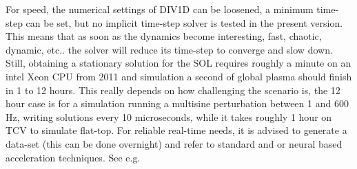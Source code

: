 \documentclass[amsmath,amssymb,a4]{revtex4-2}
\begin{document}
\noindent For speed, the numerical settings of DIV1D can be loosened, a minimum time-step can be set, but no implicit time-step solver is tested in the present version. This means that as soon as the dynamics become interesting, fast, chaotic, dynamic, etc.. the solver will reduce its time-step to converge and slow down. Still, obtaining a stationary solution for the SOL requires roughly a minute on an intel Xeon CPU from 2011 and simulation a second of global plasma should finish in 1 to 12 hours. This really depends on how challenging the scenario is, the 12 hour case is for a simulation running a multisine perturbation between 1 and 600 Hz, writing solutions every 10 microseconds, while it takes roughly 1 hour on TCV to simulate flat-top. For reliable real-time needs, it is advised to generate a data-set (this can be done overnight) and refer to standard and or neural based acceleration techniques. See e.g. \cite{poels2023}\\



\cleardoublepage
\end{document}
